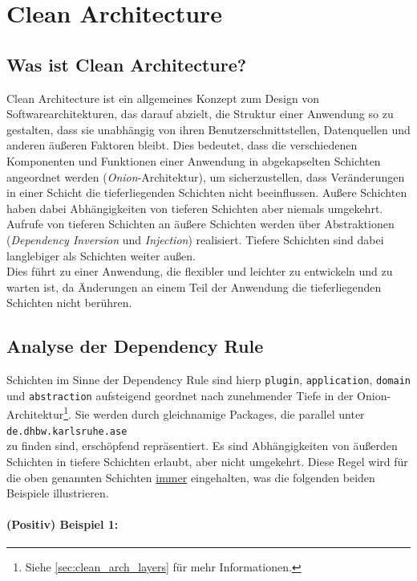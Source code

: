 \chapter{Clean Architecture}

\section{Was ist Clean Architecture?}

Clean Architecture ist ein allgemeines Konzept zum Design von Softwarearchitekturen, das darauf abzielt, 
die Struktur einer Anwendung so zu gestalten, dass sie unabhängig von ihren Benutzerschnittstellen, 
Datenquellen und anderen äußeren Faktoren bleibt. 
Dies bedeutet, dass die verschiedenen Komponenten 
und Funktionen einer Anwendung in abgekapselten Schichten angeordnet werden (\textit{Onion}-Architektur), 
um sicherzustellen, dass Veränderungen in einer Schicht die tieferliegenden Schichten nicht beeinflussen. 
Außere Schichten haben dabei Abhängigkeiten von tieferen Schichten aber niemals umgekehrt.
Aufrufe von tieferen Schichten an äußere Schichten werden über Abstraktionen (\textit{Dependency Inversion} und 
\textit{Injection}) realisiert. Tiefere Schichten sind dabei langlebiger als Schichten weiter außen. \\
Dies führt zu einer Anwendung, die flexibler und leichter zu entwickeln und zu warten ist, 
da Änderungen an einem Teil der Anwendung die tieferliegenden Schichten nicht berühren.

\section{Analyse der Dependency Rule}

Schichten im Sinne der Dependency Rule sind hierp \texttt{plugin}, \texttt{application}, \texttt{domain} 
und \texttt{abstraction} aufsteigend geordnet nach zunehmender Tiefe in der Onion-Architektur\footnote{Siehe \autoref{sec:clean_arch_layers} für mehr Informationen.}. 
Sie werden durch gleichnamige Packages, die parallel unter \\ 
\texttt{de.dhbw.karlsruhe.ase} \\
zu finden sind, erschöpfend repräsentiert. 
Es sind Abhängigkeiten von äußerden Schichten in tiefere Schichten erlaubt, aber nicht umgekehrt.
Diese Regel wird für die oben genannten Schichten \underline{immer} eingehalten, 
was die folgenden beiden Beispiele illustrieren.  

\subsubsection{(Positiv) Beispiel 1:}

